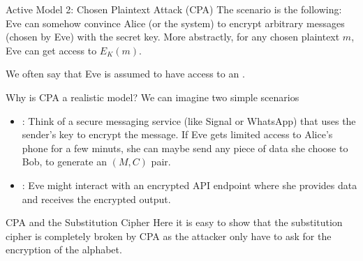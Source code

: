 \begin{parag}{Active Model 2: Chosen Plaintext Attack (CPA)}
    The scenario is the following: Eve can somehow convince Alice (or the system) to encrypt arbitrary messages (chosen by Eve) with the secret key. More abstractly, for any chosen plaintext $m$, Eve can get access to $E_K\left(m\right)$.
	\begin{framedremark}
	We often say that Eve is assumed to have access to an .
	\end{framedremark}
	\begin{subparag}{Why is CPA a realistic model?}
	    We can imagine two simple scenarios 
		\begin{itemize}
		    \item {}: Think of a secure messaging service (like Signal  or WhatsApp) that uses the sender's key to encrypt the message. If Eve gets limited access to Alice's phone for a few minuts, she can maybe send any piece of data she choose to Bob, to generate an $\left(M, C\right)$ pair.
		    \item {}: Eve might interact with an encrypted API endpoint where she provides data and receives the encrypted output.
		\end{itemize}
	\end{subparag}
	\begin{subparag}{CPA and the Substitution Cipher}
	    Here it is easy to show that the substitution cipher is completely broken by CPA as the attacker only have to ask for the encryption of the alphabet.
	\end{subparag}
\end{parag}

